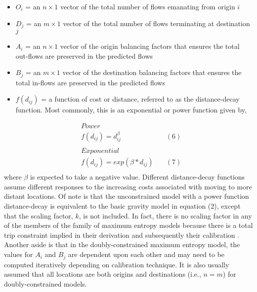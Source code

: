 \documentclass[11pt]{article}
\begin{document}
\begin{itemize}
\item
  \(O_{i}\) = an \(n \times 1\) vector of the total number of flows
  emanating from origin \(i\)
\item
  \(D_{j}\) = an \(m \times 1\) vector of the total number of flows
  terminating at destination \(j\)
\item
  \(A_{i}\) = an \(n \times 1\) vector of the origin balancing factors
  that ensures the total out-flows are preserved in the predicted flows
\item
  \(B_{j}\) = an \(m \times 1\) vector of the destination balancing
  factors that ensures the total in-flows are preserved in the predicted
  flows
\item
  \(f(d_{ij})\) = a function of cost or distance, referred to as the
  distance-decay function. Most commonly, this is an exponential or power
  function given by,
\end{itemize}
%
\[
\begin{align}
&Power\\
&f(d_{ij}) = d_{ij}^\beta \quad & (6) \\
\\
&Exponential \\
&f(d_{ij}) = exp(\beta*d_{ij}) \quad & (7) \\
\end{align}
\]
%
where \(\beta\) is expected to take a negative value. Different
distance-decay functions assume different responses to the increasing
costs associated with moving to more distant locations. Of note is that
the unconstrained model with a power function distance-decay is
equivalent to the basic gravity model in equation (2), except that the
scaling factor, \(k\), is not included. In fact, there is no scaling
factor in any of the members of the family of maximum entropy models
because there is a total trip constraint implied in their derivation
and subsequently their calibration \citep{fotheringham_spatial_1989}.
Another aside is that in the doubly-constrained maximum entropy model,
the values for \(A_{i}\) and \(B_{j}\) are dependent upon each other and
may need to be computed iteratively depending on calibration technique.
It is also usually assumed that all locations are both origins and
destinations (i.e., \(n=m\)) for doubly-constrained models.
\end{document}
